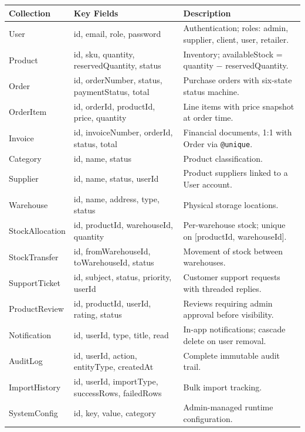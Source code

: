 \documentclass[12pt,a4paper]{report}
\begin{document}
\begin{longtable}{p{}p{}p{}}
    \toprule
    \textbf{Collection} & \textbf{Key Fields} & \textbf{Description} \\
    \midrule
    \endhead
    User & id, email, role, password & Authentication; roles: admin, supplier, client, user, retailer. \\
    Product & id, sku, quantity, reservedQuantity, status & Inventory; availableStock = quantity $-$ reservedQuantity. \\
    Order & id, orderNumber, status, paymentStatus, total & Purchase orders with six-state status machine. \\
    OrderItem & id, orderId, productId, price, quantity & Line items with price snapshot at order time. \\
    Invoice & id, invoiceNumber, orderId, status, total & Financial documents, 1:1 with Order via \texttt{@unique}. \\
    Category & id, name, status & Product classification. \\
    Supplier & id, name, status, userId & Product suppliers linked to a User account. \\
    Warehouse & id, name, address, type, status & Physical storage locations. \\
    StockAllocation & id, productId, warehouseId, quantity & Per-warehouse stock; unique on [productId, warehouseId]. \\
    StockTransfer & id, fromWarehouseId, toWarehouseId, status & Movement of stock between warehouses. \\
    SupportTicket & id, subject, status, priority, userId & Customer support requests with threaded replies. \\
    ProductReview & id, productId, userId, rating, status & Reviews requiring admin approval before visibility. \\
    Notification & id, userId, type, title, read & In-app notifications; cascade delete on user removal. \\
    AuditLog & id, userId, action, entityType, createdAt & Complete immutable audit trail. \\
    ImportHistory & id, userId, importType, successRows, failedRows & Bulk import tracking. \\
    SystemConfig & id, key, value, category & Admin-managed runtime configuration. \\
    \bottomrule
\end{longtable}
\end{document}
